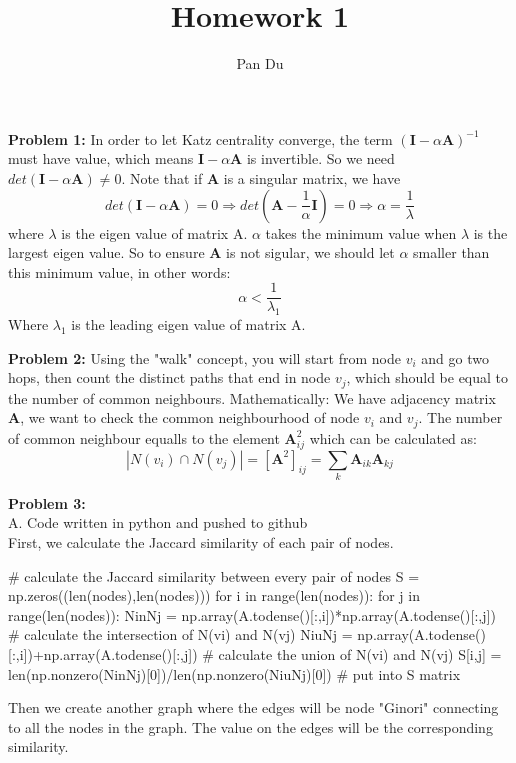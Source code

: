 \documentclass[11pt]{article}
\title{Homework 1}
\author{Pan Du}
\begin{document}
\maketitle

\textbf{Problem 1:}
In order to let Katz centrality converge, the term $(\mathbf{I}-\alpha\mathbf{A})^{-1}$ must have value, which means $\mathbf{I}-\alpha\mathbf{A}$ is invertible. So we need $det(\mathbf{I}-\alpha\mathbf{A}) \neq 0$. Note that if $\mathbf{A}$ is a singular matrix, we have $$
det(\mathbf{I}-\alpha\mathbf{A}) = 0 \Rightarrow det(\mathbf{A}-\frac{1}{\alpha}\mathbf{I}) = 0 \Rightarrow \alpha = \frac{1}{\lambda}
$$
where $\lambda$ is the eigen value of matrix A. $\alpha$ takes the minimum value when $\lambda$ is the largest eigen value. So to ensure $\mathbf{A}$ is not sigular, we should let $\alpha$ smaller than this minimum value, in other words:
$$
\alpha < \frac{1}{\lambda_1}
$$
Where $\lambda_1$ is the leading eigen value of matrix A. 


    

\clearpage


\textbf{Problem 2:}
Using the "walk" concept, you will start from node $v_i$ and go two hops, then count the distinct paths that end in node $v_j$, which should be equal to the number of common neighbours. Mathematically:
We have adjacency matrix $\mathbf{A}$, we want to check the common neighbourhood of node $v_i$ and $v_j$. The number of common neighbour equalls to the element $\mathbf{A}^2_{ij}$ which can be calculated as:
$$
    |N(v_i)\cap N(v_j)| = [\mathbf{A}^2]_{ij} = \sum_{k}{\mathbf{A}_{ik}\mathbf{A}_{kj}}
$$


\clearpage

\textbf{Problem 3:}\\
A. Code written in python and pushed to github\\
First, we calculate the Jaccard similarity of each pair of nodes. 
\begin{python}
# calculate the Jaccard similarity between every pair of nodes 
S = np.zeros((len(nodes),len(nodes)))
for i in range(len(nodes)):
    for j in range(len(nodes)):
        NinNj = np.array(A.todense()[:,i])*np.array(A.todense()[:,j]) # calculate the intersection of N(vi) and N(vj)
        NiuNj = np.array(A.todense()[:,i])+np.array(A.todense()[:,j]) # calculate the union of N(vi) and N(vj)
        S[i,j] = len(np.nonzero(NinNj)[0])/len(np.nonzero(NiuNj)[0]) # put into S matrix
\end{python}


Then we create another graph where the edges will be node "Ginori" connecting to all the nodes in the graph. The value on the edges will be the corresponding similarity. 
\end{document}
